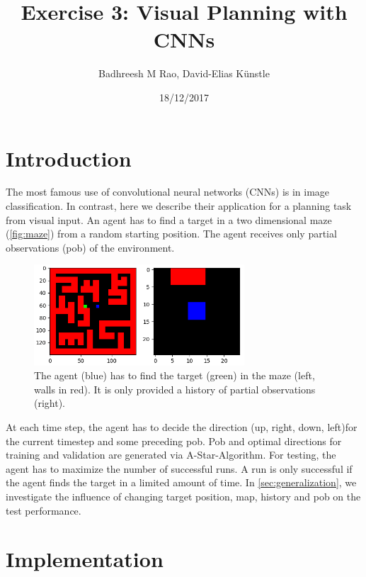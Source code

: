 \documentclass[a4paper,14pt]{article}
\begin{document}
\title{Exercise 3: Visual Planning with CNNs}
\author{Badhreesh M Rao, David-Elias K\"unstle}
\date{18/12/2017}
\maketitle
\section{Introduction}

The most famous use of convolutional neural networks (CNNs) is in image classification.
In contrast, here we describe their application for a planning task from visual input.
An agent has to find a target in a two dimensional maze  (\autoref{fig:maze}) from a random starting
position. The agent receives only partial observations (pob) of the environment.

\begin{figure}[h]
  \centering
  \includegraphics[width=0.7\textwidth]{maze}
  \caption{The agent (blue) has to find the target (green) in the maze (left,
    walls in red). It is only provided a history of partial observations
    (right).}
  \label{fig:maze}
\end{figure}

At each time step, the agent has to decide the direction (up, right, down, left)for the current timestep and some preceding pob.
Pob and optimal directions for training and validation are generated via
A-Star-Algorithm.
For testing, the agent has to maximize the number of successful runs.
A run is only successful if the agent finds the target in a limited amount of time.
In \autoref{sec:generalization}, we investigate the influence of changing target position, map,
history and pob on the test performance.

\section{Implementation}
\end{document}
